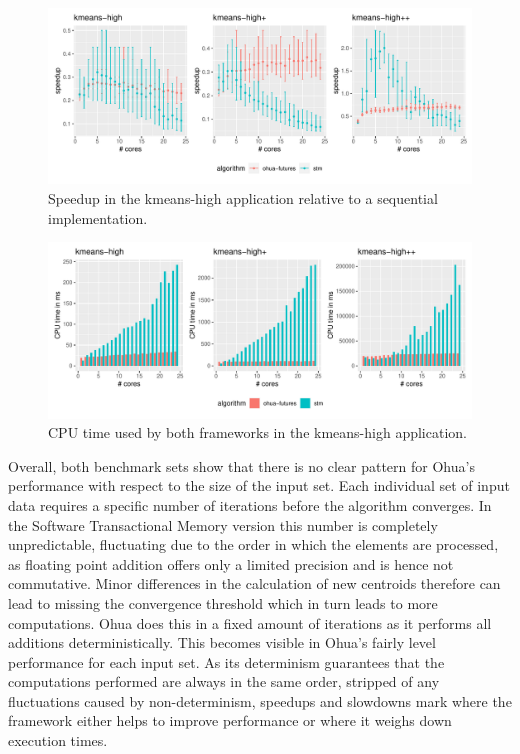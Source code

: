 \begin{figure}
    \centering
    \includegraphics[width=\textwidth,keepaspectratio]{gfx/results/kmeans-high_comb}
    \caption{Speedup in the kmeans-high application relative to a sequential implementation.}%
    \label{fig:evaluation:kmeans-high}
\end{figure}

\begin{figure}
    \centering
    \includegraphics[width=\textwidth,keepaspectratio]{gfx/results/cpu_kmeans-high_comb}
    \caption{CPU time used by both frameworks in the kmeans-high application.}%
    \label{fig:evaluation:kmeans-high-cpu}
\end{figure}

Overall, both benchmark sets show that there is no clear pattern for Ohua's performance with respect to the size of the input set.
Each individual set of input data requires a specific number of iterations before the algorithm converges.
In the Software Transactional Memory version this number is completely unpredictable, fluctuating due to the order in which the elements are processed, as floating point addition offers only a limited precision and is hence not commutative.
Minor differences in the calculation of new centroids therefore can lead to missing the convergence threshold which in turn leads to more computations.
Ohua does this in a fixed amount of iterations as it performs all additions deterministically.
This becomes visible in Ohua's fairly level performance for each input set.
As its determinism guarantees that the computations performed are always in the same order, stripped of any fluctuations caused by non-determinism, speedups and slowdowns mark where the framework either helps to improve performance or where it weighs down execution times.


